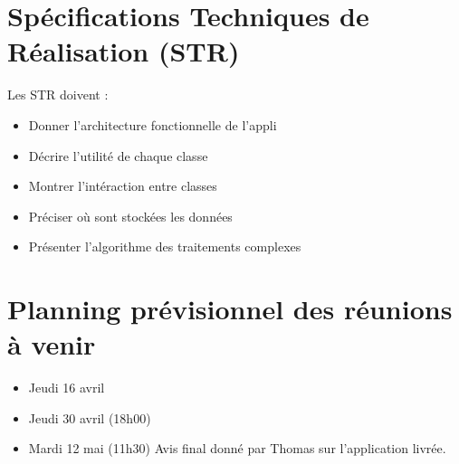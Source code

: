 \documentclass{scrartcl}
\begin{document}
\section{Spécifications Techniques de Réalisation (STR)}
Les STR doivent :
\begin{itemize}
	\item Donner l'architecture fonctionnelle de l'appli
	\item Décrire l'utilité de chaque classe
	\item Montrer l'intéraction entre classes
	\item Préciser où sont stockées les données
	\item Présenter l'algorithme des traitements complexes
\end{itemize}

\section{Planning prévisionnel des réunions à venir}
\begin{itemize}
	\item Jeudi 16 avril
	\item Jeudi 30 avril (18h00)
	\item Mardi 12 mai (11h30) Avis final donné par Thomas sur l'application livrée. 
\end{itemize}
\end{document}

